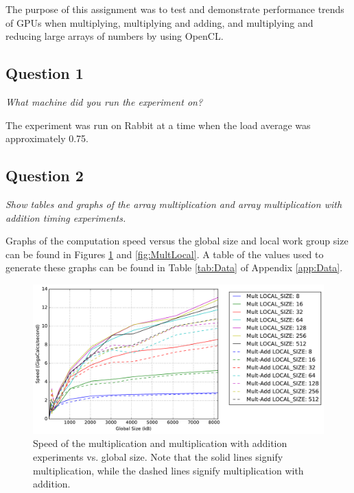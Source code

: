 \documentclass{article}
\begin{document}
The purpose of this assignment was to test and demonstrate performance trends of GPUs when multiplying, multiplying and adding, and multiplying and reducing large arrays of numbers by using OpenCL.

\subsection*{Question 1}
\textit{What machine did you run the experiment on?}

The experiment was run on Rabbit at a time when the load average was approximately 0.75.

\subsection*{Question 2}
\textit{Show tables and graphs of the array multiplication and array multiplication with addition timing experiments.}

Graphs of the computation speed versus the global size and local work group size can be found in Figures \ref{fig:MultGlobal} and \ref{fig:MultLocal}.  A table of the values used to generate these graphs can be found in Table \ref{tab:Data} of Appendix \ref{app:Data}.

\begin{figure}[h]
	\centering
        \includegraphics[width=0.7\linewidth]{Mult_Arraysize_2.pdf}
        \caption{Speed of the multiplication and multiplication with addition experiments vs. global size.  Note that the solid lines signify multiplication, while the dashed lines signify multiplication with addition.}
        \label{fig:MultGlobal}
\end{figure}
\end{document}
